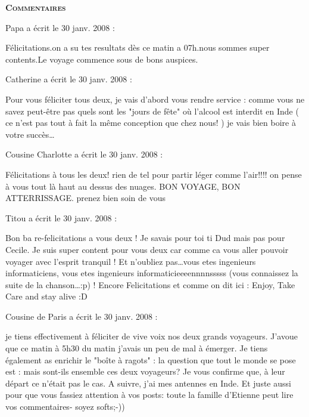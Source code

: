 \bigskip
\textbf{\textsc{Commentaires}}

\medskip
Papa a écrit le 30 janv. 2008 :
\begin{displayquote}
Félicitations.on a su tes resultats dès ce matin a 07h.nous sommes super contents.Le voyage commence sous de bons auspices.
\end{displayquote}

\medskip
Catherine a écrit le 30 janv. 2008 :
\begin{displayquote}
Pour vous féliciter tous deux, je vais d'abord vous rendre service : comme vous ne savez peut-être pas quels sont les "jours de fête" où l'alcool est interdit en Inde ( ce n'est pas tout à fait la même conception que chez nous! ) je vais bien boire à votre succès\dots
\end{displayquote}

\medskip
Cousine Charlotte a écrit le 30 janv. 2008 :
\begin{displayquote}
Félicitations à tous les deux! rien de tel pour partir léger comme l'air!!!! on pense à vous tout là haut au dessus des nuages. BON VOYAGE, BON ATTERRISSAGE. prenez bien soin de vous
\end{displayquote}

\medskip
Titou a écrit le 30 janv. 2008 :
\begin{displayquote}
Bon ba re-felicitations a vous deux ! Je savais pour toi ti Dud mais pas pour Cecile. Je suis super content pour vous deux car comme ca vous aller pouvoir voyager avec l'esprit tranquil ! Et n'oubliez pas\dots vous etes ingenieurs informaticiens, vous etes ingenieurs informaticieeeennnnsssss (vous connaissez la suite de la chanson\dots :p) ! Encore Felicitations et comme on dit ici : Enjoy, Take Care and stay alive :D
\end{displayquote}

\medskip
Cousine de Paris a écrit le 30 janv. 2008 :
\begin{displayquote}
je tiens effectivement à féliciter de vive voix nos deux grands voyageurs. J'avoue que ce matin à 5h30 du matin j'avais un peu de mal à émerger.
Je tiens également as enrichir le "boîte à ragots" : la question que tout le monde se pose est : mais sont-ils ensemble ces deux voyageurs? Je vous confirme que, à leur départ ce n'était pas le cas. A suivre, j'ai mes antennes en Inde.
Et juste aussi pour que vous fassiez attention à vos posts: toute la famille d'Etienne peut lire vos commentaires- soyez softs;-))
\end{displayquote}

